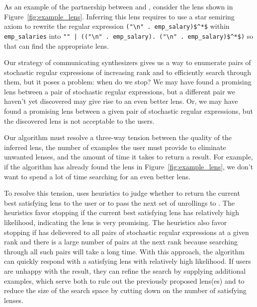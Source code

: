 \documentclass[acmsmall,screen,anonymous]{acmart}
\begin{document}
As an example of the partnership between \RXSearch and \GreedySynth,
consider the lens shown in Figure~\ref{fig:example_lens}. 
Inferring this lens requires \RXSearch to use a star semiring axiom to
rewrite the regular expression \lstinline{("\n" . emp_salary)$^*$} within
\lstinline{emp_salaries} into 
\lstinline{"" | (("\n" . emp_salary). ("\n" . emp_salary)$^*$)} 
so that \GreedySynth can find the appropriate lens.  

Our strategy of communicating synthesizers gives us a way to
enumerate pairs of stochastic regular expressions of increasing
rank and to efficiently search through them, but it poses a
problem: when do we stop? We may have found a promising lens
between a pair of stochastic regular expressions, but a different 
pair we haven't yet discovered may give rise to an even better lens. 
Or, we may have found a promising lens between a given pair of
stochastic regular expressions, but the discovered lens is not 
acceptable to the users. 

Our algorithm must resolve a three-way tension between the quality of
the inferred lens, the number of examples the user must provide to
eliminate unwanted lenses, and the amount of time it takes to return a
result.  For example, if the algorithm has already found the lens in
Figure~\ref{fig:example_lens}, we don't want to spend a lot of time
searching for an even better lens.

To resolve this tension, \RXSearch uses heuristics to judge whether to
return the current best satisfying lens to the user or to pass the
next set of unrollings to \GreedySynth.
The heuristics favor stopping if the current best satisfying
lens has relatively high likelihood, indicating the lens is very promising.
The heuristics also favor stopping if \RXSearch 
has delievered to \GreedySynth all pairs of stochastic regular
expressions at a given rank and there is a large number of pairs at the next
rank because searching through all such pairs will take a long time.
With this approach, the algorithm can quickly respond with a satisfying
lens with relatively high likelihood.  If users are unhappy with the result, they can refine the
search by supplying additional examples, which serve both to rule out
the previously proposed lens(es) and to reduce the size of the search
space by cutting down on the number of satisfying lenses.


\end{document}
